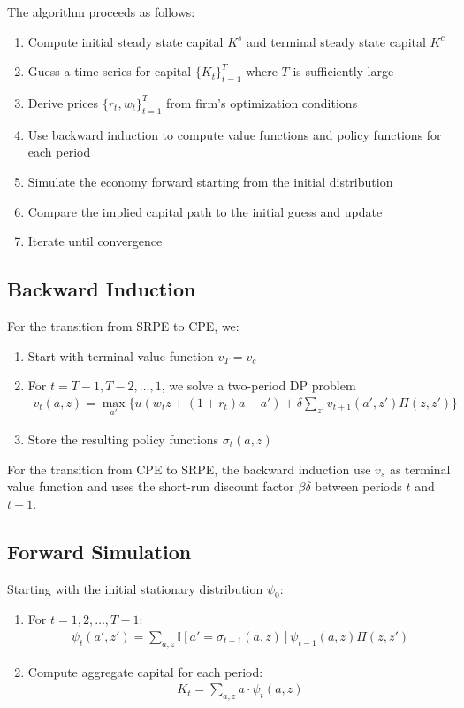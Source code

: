 \documentclass[11pt,a4paper]{article}
\begin{document}
\noindent The algorithm proceeds as follows:

\begin{enumerate}
    \item Compute initial steady state capital $K^s$ and terminal steady state capital $K^c$
    \item Guess a time series for capital $\{K_t\}_{t=1}^T$ where $T$ is sufficiently large
    \item Derive prices $\{r_t,w_t\}_{t=1}^T$ from firm's optimization conditions
    \item Use backward induction to compute value functions and policy functions for each period
    \item Simulate the economy forward starting from the initial distribution
    \item Compare the implied capital path to the initial guess and update
    \item Iterate until convergence
\end{enumerate}

\subsection{Backward Induction}

For the transition from SRPE to CPE, we:
\begin{enumerate}
    \item Start with terminal value function $v_T = v_c$
    \item For $t = T-1, T-2, \ldots, 1$, we solve a two-period DP problem 
        \begin{align}
            v_t(a,z) = \max_{a'} \{u(w_tz + (1+r_t)a - a') + \delta\sum_{z'} v_{t+1}(a',z')\Pi(z,z')\}
        \end{align}
    \item Store the resulting policy functions $\sigma_t(a,z)$
\end{enumerate}

\noindent For the transition from CPE to SRPE, the backward induction use $v_s$ as terminal value function and uses the short-run discount factor $\beta\delta$ between periods $t$ and $t-1$.

\subsection{Forward Simulation}

Starting with the initial stationary distribution $\psi_0$:
\begin{enumerate}
    \item For $t = 1, 2, \ldots, T-1$:
        \begin{align}
            \psi_t(a',z') = \sum_{a,z} \mathbb{I}[a' = \sigma_{t-1}(a,z)]\psi_{t-1}(a,z)\Pi(z,z')
        \end{align}
    \item Compute aggregate capital for each period:
        \begin{align}
            K_t = \sum_{a,z} a \cdot \psi_t(a,z)
        \end{align}
\end{enumerate}
\end{document}
